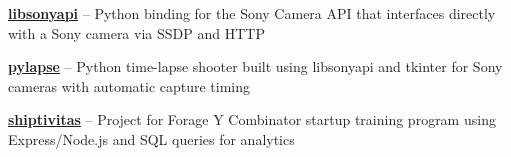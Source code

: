 \textbf{\href{https://github.com/petabite/libsonyapi}{libsonyapi}} -- Python binding for the Sony Camera API that interfaces directly with a Sony camera via SSDP and HTTP

\smdivider

\textbf{\href{https://github.com/petabite/pylapse}{pylapse}} -- Python time-lapse shooter built using libsonyapi and tkinter for Sony cameras with automatic capture timing

\smdivider



\textbf{\href{https://github.com/petabite/shiptivitas-1}{shiptivitas}} -- Project for Forage Y Combinator startup training program using Express/Node.js and SQL queries for analytics

















